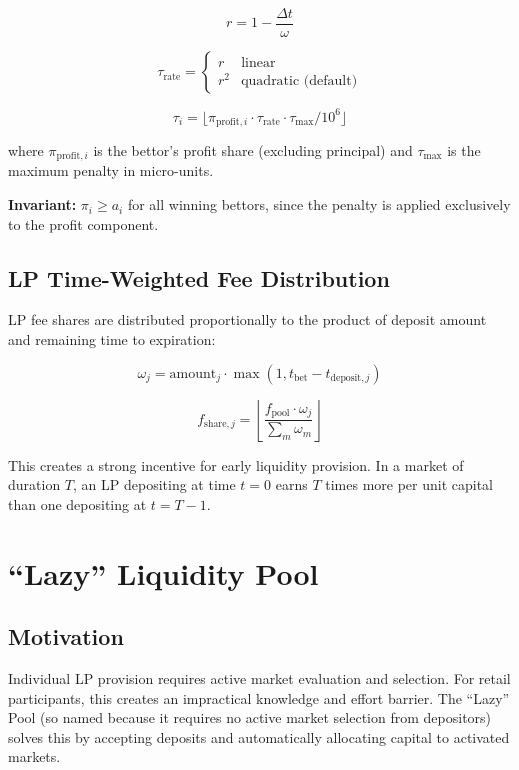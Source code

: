 \documentclass{ledger}
\theoremstyle{plain}
\theoremstyle{remark}
\begin{document}
\[
r = 1 - \frac{\Delta t}{\omega}
\]

\[
\tau_{\text{rate}} = \begin{cases} r & \text{linear} \\ r^2 &
\text{quadratic (default)} \end{cases}
\]

\[
\tau_i = \lfloor \pi_{\text{profit},i} \cdot \tau_{\text{rate}} \cdot
\tau_{\max} / 10^6 \rfloor
\]

where $\pi_{\text{profit},i}$ is the bettor's profit share (excluding principal)
and $\tau_{\max}$ is the maximum penalty in micro-units.

\textbf{Invariant:} $\pi_i \geq a_i$ for all winning bettors, since the penalty
is applied exclusively to the profit component.

\subsection{LP Time-Weighted Fee Distribution}\label{sec:lpfee}

LP fee shares are distributed proportionally to the product of deposit amount
and remaining time to expiration:

\[
\omega_j = \text{amount}_j \cdot \max(1, t_{\text{bet}} - t_{\text{deposit},j})
\]

\[
f_{\text{share},j} = \left\lfloor \frac{f_{\text{pool}} \cdot \omega_j}{\sum_m
\omega_m} \right\rfloor
\]

This creates a strong incentive for early liquidity provision. In a market of
duration $T$, an LP depositing at time $t = 0$ earns $T$ times more per unit
capital than one depositing at $t = T - 1$.

\section{``Lazy'' Liquidity Pool}\label{sec:lazypool}

\subsection{Motivation}

Individual LP provision requires active market evaluation and selection. For
retail participants, this creates an impractical knowledge and effort barrier.
The ``Lazy'' Pool (so named because it requires no active market selection from
depositors) solves this by accepting deposits and automatically allocating
capital to activated markets.
\end{document}
